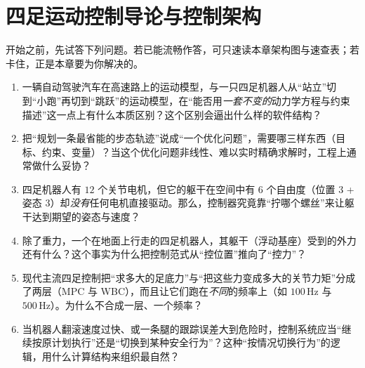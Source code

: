 \chapter{四足运动控制导论与控制架构}
\label{ch:quad_arch}


\begin{practice}[前置自测]
开始之前，先试答下列问题。若已能流畅作答，可只速读本章架构图与速查表；若卡住，正是本章要为你解决的。
\begin{enumerate}
  \item 一辆自动驾驶汽车在高速路上的运动模型，与一只四足机器人从“站立”切到“小跑”再切到“跳跃”的运动模型，在“能否用\emph{一套不变的}动力学方程与约束描述”这一点上有什么本质区别？这个区别会逼出什么样的软件结构？
  \item 把“规划一条最省能的步态轨迹”说成“一个优化问题”，需要哪三样东西（目标、约束、变量）？当这个优化问题非线性、难以实时精确求解时，工程上通常做什么妥协？
  \item 四足机器人有 $12$ 个关节电机，但它的躯干在空间中有 $6$ 个自由度（位置 $3$ + 姿态 $3$）却\emph{没有}任何电机直接驱动。那么，控制器究竟靠“拧哪个螺丝”来让躯干达到期望的姿态与速度？
  \item 除了重力，一个在地面上行走的四足机器人，其躯干（浮动基座）受到的外力还有什么？这个事实为什么把控制范式从“控位置”推向了“控力”？
  \item 现代主流四足控制把“求多大的足底力”与“把这些力变成多大的关节力矩”分成了两层（MPC 与 WBC），而且让它们跑在\emph{不同}的频率上（如 $100\,\mathrm{Hz}$ 与 $500\,\mathrm{Hz}$）。为什么不合成一层、一个频率？
  \item 当机器人翻滚速度过快、或一条腿的跟踪误差大到危险时，控制系统应当“继续按原计划执行”还是“切换到某种安全行为”？这种“按情况切换行为”的逻辑，用什么计算结构来组织最自然？
\end{enumerate}
\end{practice}

